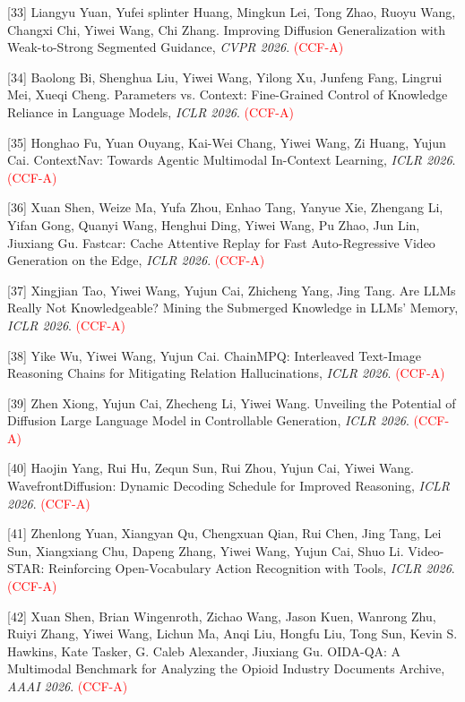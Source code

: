 [33] Liangyu Yuan, Yufei splinter Huang, Mingkun Lei, Tong Zhao, Ruoyu Wang, Changxi Chi, Yiwei Wang, Chi Zhang. Improving Diffusion Generalization with Weak-to-Strong Segmented Guidance, \textit{CVPR 2026}. \textcolor{red}{(CCF-A)}

[34] Baolong Bi, Shenghua Liu, Yiwei Wang, Yilong Xu, Junfeng Fang, Lingrui Mei, Xueqi Cheng. Parameters vs. Context: Fine-Grained Control of Knowledge Reliance in Language Models, \textit{ICLR 2026}. \textcolor{red}{(CCF-A)}

[35] Honghao Fu, Yuan Ouyang, Kai-Wei Chang, Yiwei Wang, Zi Huang, Yujun Cai. ContextNav: Towards Agentic Multimodal In-Context Learning, \textit{ICLR 2026}. \textcolor{red}{(CCF-A)}

[36] Xuan Shen, Weize Ma, Yufa Zhou, Enhao Tang, Yanyue Xie, Zhengang Li, Yifan Gong, Quanyi Wang, Henghui Ding, Yiwei Wang, Pu Zhao, Jun Lin, Jiuxiang Gu. Fastcar: Cache Attentive Replay for Fast Auto-Regressive Video Generation on the Edge, \textit{ICLR 2026}. \textcolor{red}{(CCF-A)}

[37] Xingjian Tao, Yiwei Wang, Yujun Cai, Zhicheng Yang, Jing Tang. Are LLMs Really Not Knowledgeable? Mining the Submerged Knowledge in LLMs' Memory, \textit{ICLR 2026}. \textcolor{red}{(CCF-A)}

[38] Yike Wu, Yiwei Wang, Yujun Cai. ChainMPQ: Interleaved Text-Image Reasoning Chains for Mitigating Relation Hallucinations, \textit{ICLR 2026}. \textcolor{red}{(CCF-A)}

[39] Zhen Xiong, Yujun Cai, Zhecheng Li, Yiwei Wang. Unveiling the Potential of Diffusion Large Language Model in Controllable Generation, \textit{ICLR 2026}. \textcolor{red}{(CCF-A)}

[40] Haojin Yang, Rui Hu, Zequn Sun, Rui Zhou, Yujun Cai, Yiwei Wang. WavefrontDiffusion: Dynamic Decoding Schedule for Improved Reasoning, \textit{ICLR 2026}. \textcolor{red}{(CCF-A)}

[41] Zhenlong Yuan, Xiangyan Qu, Chengxuan Qian, Rui Chen, Jing Tang, Lei Sun, Xiangxiang Chu, Dapeng Zhang, Yiwei Wang, Yujun Cai, Shuo Li. Video-STAR: Reinforcing Open-Vocabulary Action Recognition with Tools, \textit{ICLR 2026}. \textcolor{red}{(CCF-A)}

[42] Xuan Shen, Brian Wingenroth, Zichao Wang, Jason Kuen, Wanrong Zhu, Ruiyi Zhang, Yiwei Wang, Lichun Ma, Anqi Liu, Hongfu Liu, Tong Sun, Kevin S. Hawkins, Kate Tasker, G. Caleb Alexander, Jiuxiang Gu. OIDA-QA: A Multimodal Benchmark for Analyzing the Opioid Industry Documents Archive, \textit{AAAI 2026}. \textcolor{red}{(CCF-A)}

